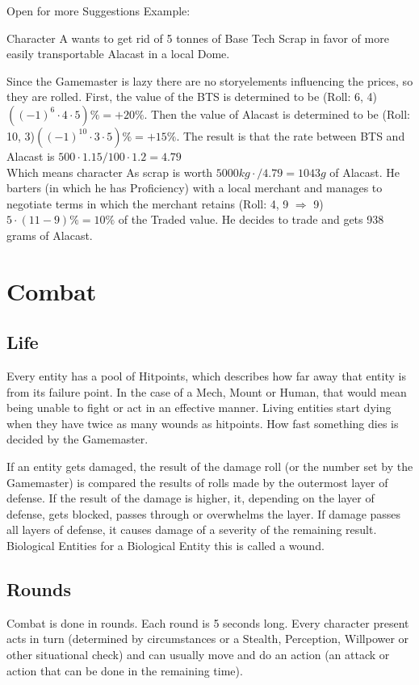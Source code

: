 Open for more Suggestions\vspace{1.5cm}
Example:\par
Character A wants to get rid of 5 tonnes of Base Tech Scrap in favor of more easily transportable Alacast in a local
Dome.\par
Since the Gamemaster is lazy there are no storyelements influencing the prices, so they are rolled.
First, the value of
the BTS is determined to be (Roll: 6, 4) \(((-1)^{6}\cdot4\cdot5) \% = +20\%\).
Then the value of Alacast is determined
to be (Roll: 10, 3)\(((-1)^{10}\cdot3\cdot5) \% = +15\%\).
The result is that the rate between BTS and Alacast is
\( 500\cdot1.15/100\cdot1.2 = 4.79\) \\ Which means character As scrap is worth
\(5000 kg\cdot / 4.79 = 1043 g \) of Alacast.
He barters (in which he has Proficiency) with a local merchant and manages to
negotiate terms in which the merchant retains (Roll: 4, 9 \(\Rightarrow\) 9) \(5\cdot(11-9)\% = 10\%\) of the Traded
value.
He decides to trade and gets 938 grams of Alacast.\vspace{1.5cm}
\pagebreak[1]
\section{Combat}\label{subsec:combat}
\subsection{Life}
Every entity has a pool of Hitpoints, which describes how far away that entity is from its failure point.
In the case of a Mech, Mount or Human, that would mean being unable to fight or act in an effective manner.
Living
entities start dying when they have twice as many wounds as hitpoints.
How fast something dies is decided by the
Gamemaster.\par
If an entity gets damaged, the result of the damage roll (or the number set by the Gamemaster) is compared the results
of rolls made by the outermost layer of defense.
If the result of the damage is higher, it, depending on the
layer of defense, gets blocked, passes through or overwhelms the layer.
If damage passes all layers of defense,
it causes damage of a severity of the remaining result.
Biological Entities for a Biological Entity this is called a wound.
\subsection{Rounds}
Combat is done in rounds.
Each round is 5 seconds long.
Every character present acts in turn (determined
by circumstances or a Stealth, Perception, Willpower or other situational check) and can usually move and do an action
(an attack or action that can be done in the remaining time).
